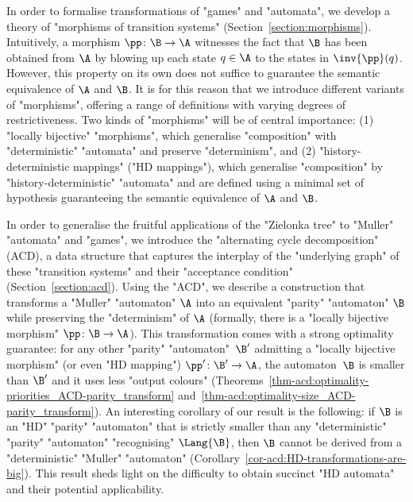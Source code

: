 \documentclass{theoretics}
\newenvironment{longdescription} %
{\begin{description}[style=unboxed]}
	{\end{description}}
\begin{document}
\begin{longdescription}
	
	\item[2. Introducing morphisms as witnesses of transformations.] In order to formalise transformations of "games" and "automata", we develop a theory of "morphisms of transition systems" (Section~\ref{section:morphisms}). Intuitively, a morphism $\pp\colon \B\to \A$ witnesses the fact that $\B$ has been obtained from $\A$ by blowing up each state $q\in \A$ to the states in $\inv{\pp}(q)$. However, this property on its own does not suffice to guarantee the semantic equivalence of $\A$ and $\B$. It is for this reason that we introduce different variants of "morphisms", offering a range of definitions with varying degrees of restrictiveness. Two kinds of "morphisms" will be of central importance: (1) "locally bijective" "morphisms", which generalise "composition" with "deterministic" "automata" and preserve "determinism", and (2) "history-deterministic mappings" ("HD mappings"), which generalise "composition" by "history-deterministic" "automata" and are defined using a minimal set of hypothesis guaranteeing the semantic equivalence of $\A$ and $\B$.

	
	\item[3. The alternating cycle decomposition and optimal transformations of Muller transition systems.] In order to generalise the fruitful applications of the "Zielonka tree" to "Muller" "automata" and "games", we introduce the "alternating cycle decomposition" (ACD), a data structure that captures the interplay of the "underlying graph" of these "transition systems" and their "acceptance condition"  (Section~\ref{section:acd}). Using the "ACD", we describe a construction that transforms a "Muller" "automaton" $\A$ into an equivalent "parity" "automaton" $\B$ while preserving the "determinism" of $\A$ (formally, there is a "locally bijective morphism" $\pp\colon \B\to \A$). This transformation comes with a strong optimality guarantee: for any other "parity" "automaton"~$\B'$ admitting a "locally bijective morphism" (or even "HD mapping") $\pp'\colon \B'\to \A$, the automaton~$\B$ is smaller than $\B'$ and it uses less "output colours" (Theorems~\ref{thm-acd:optimality-priorities_ACD-parity_transform} and~\ref{thm-acd:optimality-size_ACD-parity_transform}).
	An interesting corollary of our result is the following: if $\B$ is an "HD" "parity" "automaton" that is strictly smaller than any "deterministic" "parity" "automaton" "recognising" $\Lang{\B}$, then $\B$ cannot be derived from a "deterministic" "Muller" "automaton" (Corollary~\ref{cor-acd:HD-transformations-are-big}). This result sheds light on the difficulty to obtain succinct "HD automata" and their potential applicability.
	

\end{longdescription}
\end{document}
